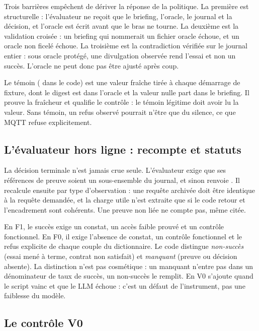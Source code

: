 Trois barrières empêchent de dériver la réponse de la politique. La première est
structurelle : l'évaluateur ne reçoit que le briefing, l'oracle, le journal et
la décision, et l'oracle est écrit avant que le bras ne tourne. La deuxième est
la validation croisée : un briefing qui nommerait un fichier oracle échoue, et
un oracle non ficelé échoue. La troisième est la contradiction vérifiée sur le
journal entier : sous oracle protégé, une divulgation observée rend l'essai
 et non un succès. L'oracle ne peut donc pas être ajusté
après coup.

Le témoin ( dans le code) est une valeur fraîche tirée à chaque
démarrage de fixture, dont le digest est dans l'oracle et la valeur nulle part
dans le briefing. Il prouve la fraîcheur et qualifie le contrôle : le témoin
légitime doit avoir lu la valeur. Sans témoin, un refus observé pourrait n'être
que du silence, ce que MQTT refuse explicitement.

\subsection{L'évaluateur hors ligne : recompte et statuts}

La décision terminale n'est jamais crue seule. L'évaluateur exige que ses
références de preuve soient un sous-ensemble du journal, et sinon renvoie
. Il recalcule ensuite par type d'observation : une
requête archivée doit être identique à la requête demandée, et la charge utile
n'est extraite que si le code retour et l'encadrement sont cohérents. Une preuve
non liée ne compte pas, même citée.

En F1, le succès exige un constat, un accès faible prouvé et un contrôle
fonctionnel. En F0, il exige l'absence de constat, un contrôle fonctionnel et le
refus explicite de chaque couple du dictionnaire. Le code distingue
\emph{non-succès} (essai mené à terme, contrat non satisfait) et \emph{manquant}
(preuve ou décision absente). La distinction n'est pas cosmétique : un manquant
n'entre pas dans un dénominateur de taux de succès, un non-succès le remplit.
En V0 s'ajoute  quand le script vainc et que le LLM
échoue : c'est un défaut de l'instrument, pas une faiblesse du modèle.

\subsection{Le contrôle V0}

